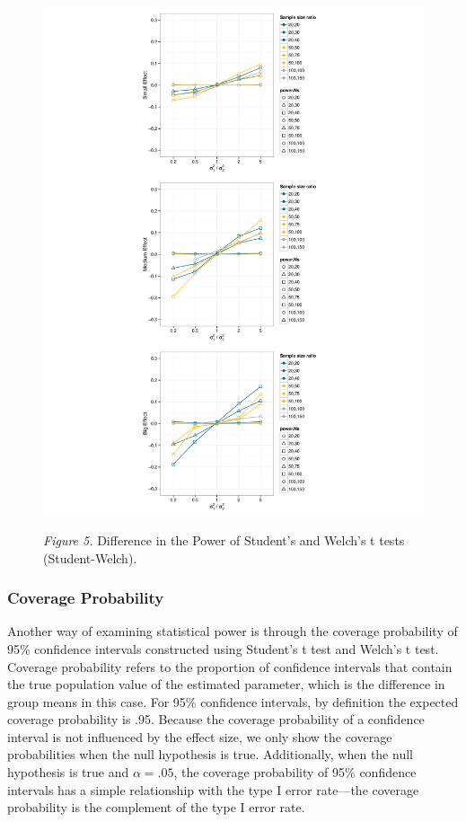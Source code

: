 \documentclass[man,a4paper,noextraspace,apacite]{apa6}
\begin{document}
\begin{figure}
\includegraphics{WelchManuscript-MASTER-plotPowerDiff}

\textit{Figure 5.} Difference in the Power of Student's and Welch's t tests 
(Student-Welch).
\end{figure}

\subsubsection{Coverage Probability}
Another way of examining statistical power is through the coverage probability 
of 95\% confidence intervals constructed using Student's t test and Welch's t 
test. Coverage probability refers to the proportion of confidence intervals 
that contain the true population value of the estimated parameter, which is the 
difference in group means in this case. For 95\% confidence intervals, by 
definition the expected coverage probability is .95. Because the coverage 
probability of a confidence interval is not influenced by the effect size, we 
only show the coverage probabilities when the null hypothesis is true. 
Additionally, when the null hypothesis is true and $\alpha = .05$, the coverage 
probability of 95\% confidence intervals has a simple relationship with the 
type I error rate---the coverage probability is the complement of the type I 
error rate. 
\end{document}
